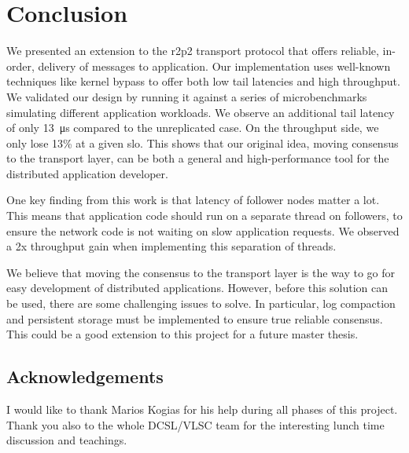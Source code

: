 \chapter{Conclusion}

We presented an extension to the \gls{r2p2} transport protocol that offers reliable, in-order, delivery of messages to application.
Our implementation uses well-known techniques like kernel bypass to offer both low tail latencies and high throughput.
We validated our design by running it against a series of microbenchmarks simulating different application workloads.
We observe an additional tail latency of only \SI{13}{\micro\second} compared to the unreplicated case.
On the throughput side, we only lose 13\% at a given \gls{slo}.
This shows that our original idea, moving consensus to the transport layer, can be both a general and high-performance tool for the distributed application developer. 

One key finding from this work is that latency of follower nodes matter a lot.
This means that application code should run on a separate thread on followers, to ensure the network code is not waiting on slow application requests.
We observed a 2x throughput gain when implementing this separation of threads.

We believe that moving the consensus to the transport layer is the way to go for easy development of distributed applications.
However, before this solution can be used, there are some challenging issues to solve.
In particular, log compaction and persistent storage must be implemented to ensure true reliable consensus.
This could be a good extension to this project for a future master thesis.

\section*{Acknowledgements}

I would like to thank Marios Kogias for his help during all phases of this project.
Thank you also to the whole DCSL/VLSC team for the interesting lunch time discussion and teachings.
